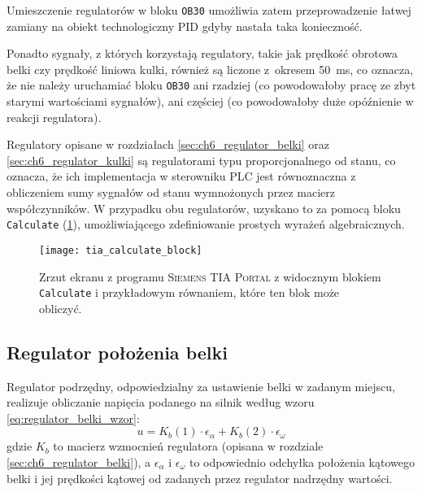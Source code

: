 Umieszczenie regulatorów w bloku \texttt{OB30} umożliwia zatem przeprowadzenie łatwej zamiany na obiekt technologiczny PID gdyby nastała taka konieczność.

Ponadto sygnały, z których korzystają regulatory, takie jak prędkość obrotowa belki czy prędkość liniowa kulki, również są liczone z~okresem \SI{50}{\milli\second}, co oznacza, że nie należy uruchamiać bloku \texttt{OB30} ani rzadziej (co powodowałoby pracę ze zbyt starymi wartościami sygnałów), ani częściej (co powodowałoby duże opóźnienie w reakcji regulatora).

Regulatory opisane w rozdziałach \ref{sec:ch6_regulator_belki} oraz \ref{sec:ch6_regulator_kulki} są regulatorami typu proporcjonalnego od stanu, co oznacza, że ich implementacja w sterowniku PLC jest równoznaczna z obliczeniem sumy sygnałów od stanu wymnożonych przez macierz współczynników. W przypadku obu regulatorów, uzyskano to za pomocą bloku \texttt{Calculate} (\cref{fig:tia_portal_blok_calculate}), umożliwiającego zdefiniowanie prostych wyrażeń algebraicznych.

\begin{figure}[h]
    \centering
    \texttt{[image: tia\_calculate\_block]}
    \caption{Zrzut ekranu z programu \textsc{Siemens TIA Portal} z widocznym blokiem \texttt{Calculate} i przykładowym równaniem, które ten blok może obliczyć.}
    \label{fig:tia_portal_blok_calculate}
\end{figure}


\subsection{Regulator położenia belki}
\label{subsec:ch7_regulator_belki}

Regulator podrzędny, odpowiedzialny za ustawienie belki w zadanym miejscu, realizuje obliczanie napięcia podanego na silnik według wzoru \eqref{eq:regulator_belki_wzor}:
\begin{equation}
    u = K_b(1) \cdot \epsilon_\alpha + K_b(2) \cdot \epsilon_\omega
    \label{eq:regulator_belki_wzor}
\end{equation}
gdzie $K_b$ to macierz wzmocnień regulatora (opisana w rozdziale \ref{sec:ch6_regulator_belki}), a $\epsilon_\alpha$ i $\epsilon_\omega$ to odpowiednio odchyłka położenia kątowego belki i jej prędkości kątowej od zadanych przez regulator nadrzędny wartości.

